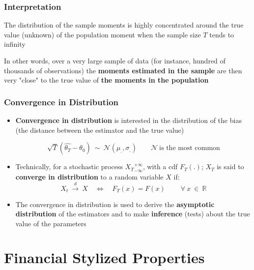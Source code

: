 \documentclass{beamer}
\newenvironment{wideenumerate}{\enumerate\addtolength{\itemsep}{10pt}}{\endenumerate}
\begin{document}
  \begin{frame}
    \frametitle{Interpretation}
    \begin{wideenumerate}
    \item The distribution of the sample moments is highly concentrated around the true value (unknown) of the population moment when the sample size $T$ tends to infinity
    \item In other words, over a very large sample of data (for instance, hundred of thousands of observations) the \textbf{moments estimated in the sample} are then very "close" to the true value of \textbf{the moments in the population}
    \end{wideenumerate}
  \end{frame}
  

  \begin{frame}
    \frametitle{Convergence in Distribution}

    \begin{itemize}
\item  \textbf{Convergence in distribution} is interested in the distribution of the bias (the distance between the estimator and the true value)

  \begin{equation*}
    \sqrt{T} \left(\hat{\theta_T} - \theta_0 \right) \ \sim \ \mathcal{N}(\mu_., \sigma_.) \qquad \mathcal{N} \ \text{is the most common} 
  \end{equation*}

\item Technically, for a stochastic process ${X_T}_{-\infty}^ {+\infty}$, with a cdf $F_T(.)$; $X_T$ is said to \textbf{converge in distribution} to a random variable $X$ if:
  \begin{equation*}
X_t \ \overset{d}{\to} \ X \quad \Leftrightarrow \quad  F_T(x) = F(x) \qquad \ \forall \ x \ \in \ \mathbb{R}
  \end{equation*}
    
\item The convergence in distribution is used to derive the \textbf{asymptotic distribution} of the estimators and to make \textbf{inference} (tests) about the true value of the parameters

    \end{itemize}
    
  \end{frame}



\section{Financial Stylized Properties}
\end{document}

